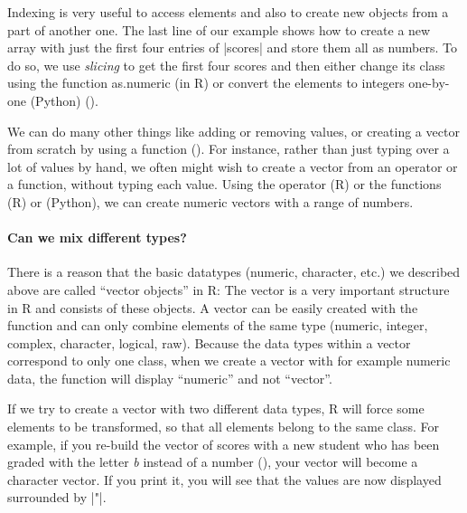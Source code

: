 Indexing is very useful to access elements and also to
create new objects from a part of another one. The last line of our
example shows how to create a new array with just the first four
entries of |scores| and store them all as numbers. To do so, we
use \emph{slicing} to get the first four scores and then either change its class using the function
as.numeric (in R) or convert the elements to integers one-by-one (Python)  ().



We can do many other things like adding or removing values, or creating a vector from scratch by using a
function (). For instance, rather than just typing over a lot of values by hand, we often might
wish to create a vector from an operator or a function, without typing
each value. Using the operator \fn{:} (R) or the functions  (R) or  (Python), we can create numeric vectors with
a range of numbers.%



\paragraph[Can we mix different types?]{Can we mix different types?\eatpunct}
There is a reason that the basic datatypes (numeric, character, etc.) we described above are called
``vector objects'' in R: The vector is a very important structure in
R and consists of these objects. A vector can be easily created with the
 function and can only combine elements of the same type (numeric, integer, complex,
character, logical, raw).
Because the data types within a vector correspond to only one class,
when we create a vector with for example numeric data, the  function will display
``numeric'' and not ``vector''.

If we try to
create a vector with two different data types, R will 
force some elements to be transformed, so that all elements belong to the same
class. For example, if you re-build the vector of scores with a new student who has
been graded with the letter \emph{b} instead of a number (), your vector
will become a character vector. If you print it, you will see that the
values are now displayed surrounded by |"|.


